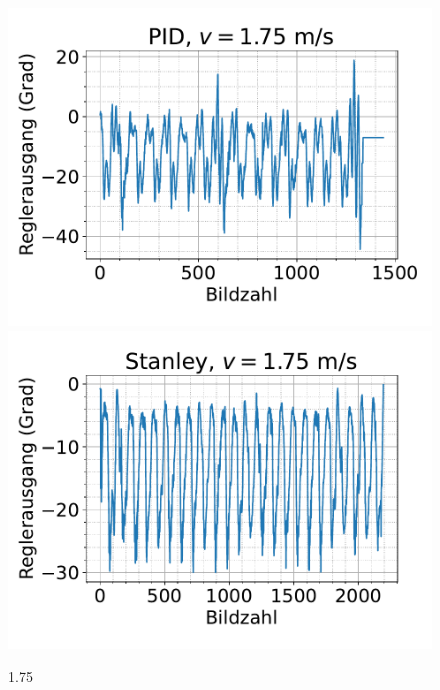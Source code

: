 \documentclass[arbeit=studie,oneside,BCOR=12mm]{ArbeitRST}
\begin{document}
\begin{figure}[h]
    \centering
    \includegraphics[scale=0.47]{pid1.75}
    \includegraphics[scale=0.47]{Stan1.75}
    \caption{1.75}
    \label{reg:1.75}
\end{figure}
\end{document}
